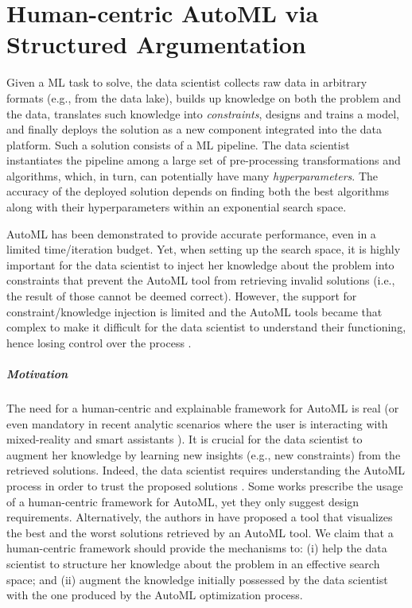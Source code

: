 \chapter{Human-centric AutoML via Structured Argumentation}
\label{human-centric-chap:hamlet}


Given a ML task to solve, the data scientist collects raw data in arbitrary formats (e.g., from the data lake), builds up knowledge on both the problem and the data, translates such knowledge into \emph{constraints}, designs and trains a model, and finally deploys the solution as a new component integrated into the data platform.
Such a solution consists of a ML pipeline.
The data scientist instantiates the pipeline among a large set of pre-processing transformations and algorithms, which, in turn, can potentially have many \emph{hyperparameters}.
The accuracy of the deployed solution depends on finding both the best algorithms along with their hyperparameters within an exponential search space.

AutoML has been demonstrated to provide accurate performance, even in a limited time/iteration budget.
Yet, when setting up the search space, it is highly important for the data scientist to inject her knowledge about the problem into constraints that prevent the AutoML tool from retrieving invalid solutions (i.e., the result of those cannot be deemed correct).
However, the support for constraint/knowledge injection is limited and the AutoML tools became that complex to make it difficult for the data scientist to understand their functioning, hence losing control over the process \cite{XinWLSP21automationml}.

\paragraph{Motivation}
The need for a human-centric and explainable framework for AutoML is real \cite{gil2019towards, lee2020human, wang2019human} (or even mandatory in recent analytic scenarios where the user is interacting with mixed-reality and smart assistants \cite{DBLP:conf/dolap/FranciaGR19,DBLP:journals/is/FranciaGG22}).
It is crucial for the data scientist to augment her knowledge by learning new insights (e.g., new constraints) from the retrieved solutions.
Indeed, the data scientist requires understanding the AutoML process in order to trust the proposed solutions \cite{drozdal2020trust}.
Some works \cite{gil2019towards, lee2020human, wang2019human} prescribe the usage of a human-centric framework for AutoML, yet they only suggest design requirements.
Alternatively, the authors in \cite{ono2020pipelineprofiler} have proposed a tool that visualizes the best and the worst solutions retrieved by an AutoML tool.
We claim that a human-centric framework should provide the mechanisms to: (i) help the data scientist to structure her knowledge about the problem in an effective search space; and (ii) augment the knowledge initially possessed by the data scientist with the one produced by the AutoML optimization process.

